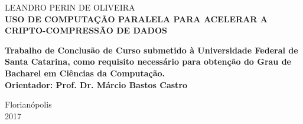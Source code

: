 
\begin{center}

    {\large LEANDRO PERIN DE OLIVEIRA\\}
    \vspace{8cm}
    {\Large \textsc\textbf{{USO DE COMPUTAÇÃO PARALELA PARA ACELERAR A CRIPTO-COMPRESSÃO DE DADOS} }\\}
    \vspace{1cm}
    \hspace{.45\linewidth}
    \begin{minipage}{.50\linewidth}

            \textbf{Trabalho de Conclusão de Curso submetido à Universidade Federal de Santa Catarina,  como requisito 
            necessário para obtenção do Grau de Bacharel em Ciências da Computação. \\
            Orientador: Prof. Dr. Márcio Bastos Castro}

           
    
    \end{minipage}

    \vspace{2cm}
    \vfill
    {\large Florianópolis \\ 2017}
\end{center}

